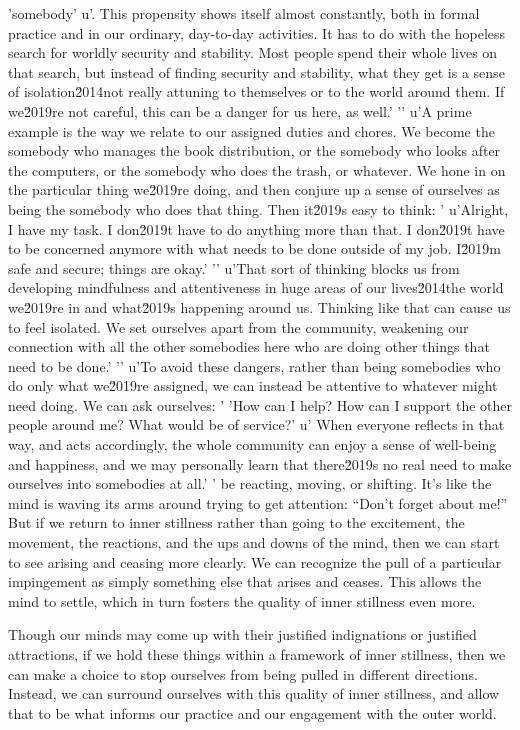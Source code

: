 'somebody'
u'. This propensity shows itself almost constantly, both in formal practice and in our ordinary, day-to-day activities. It has to do with the hopeless search for worldly security and stability. Most people spend their whole lives on that search, but instead of finding security and stability, what they get is a sense of isolation\u2014not really attuning to themselves or to the world around them. If we\u2019re not careful, this can be a danger for us here, as well.'
'\n'
u'A prime example is the way we relate to our assigned duties and chores. We become the somebody who manages the book distribution, or the somebody who looks after the computers, or the somebody who does the trash, or whatever. We hone in on the particular thing we\u2019re doing, and then conjure up a sense of ourselves as being the somebody who does that thing. Then it\u2019s easy to think: '
u'Alright, I have my task. I don\u2019t have to do anything more than that. I don\u2019t have to be concerned anymore with what needs to be done outside of my job. I\u2019m safe and secure; things are okay.'
'\n'
u'That sort of thinking blocks us from developing mindfulness and attentiveness in huge areas of our lives\u2014the world we\u2019re in and what\u2019s happening around us. Thinking like that can cause us to feel isolated. We set ourselves apart from the community, weakening our connection with all the other somebodies here who are doing other things that need to be done.'
'\n'
u'To avoid these dangers, rather than being somebodies who do only what we\u2019re assigned, we can instead be attentive to whatever might need doing. We can ask ourselves: '
'How can I help? How can I support the other people around me? What would be of service?'
u' When everyone reflects in that way, and acts accordingly, the whole community can enjoy a sense of well-being and happiness, and we may personally learn that there\u2019s no real need to make ourselves into somebodies at all.'
' be 
reacting, moving, or shifting. It's like the mind is waving its arms 
around trying to get attention: ``Don't forget about me!'' But if we 
return to inner stillness rather than going to the excitement, the 
movement, the reactions, and the ups and downs of the mind, then we can 
start to see arising and ceasing more clearly. We can recognize the 
pull of a particular impingement as simply something else that arises 
and ceases. This allows the mind to settle, which in turn fosters the 
quality of inner stillness even more.

Though our minds may come up with their justified indignations or 
justified attractions, if we hold these things within a framework of 
inner stillness, then we can make a choice to stop ourselves from being 
pulled in different directions. Instead, we can surround ourselves with 
this quality of inner stillness, and allow that to be what informs our 
practice and our engagement with the outer world.

